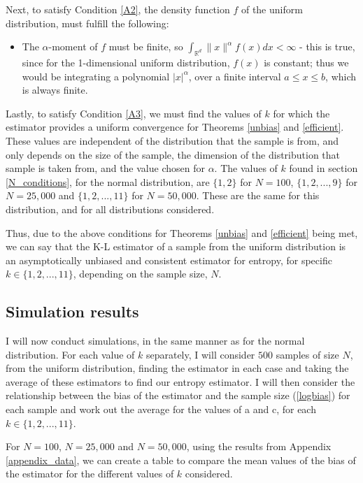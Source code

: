 \documentclass[12pt]{report}
\begin{document}
Next, to satisfy Condition \ref{A2}, the density function $f$ of the uniform distribution, must fulfill the following:
\begin{itemize}
\item The $\alpha$-moment of $f$ must be finite, so $\int_{\mathbb{R}^{d}} \| x \|^{\alpha} f(x) dx < \infty$ - this is true, since for the 1-dimensional uniform distribution, $f(x)$ is constant; thus we would be integrating a polynomial $|x|^{\alpha}$, over a finite interval $a \leq x \leq b$, which is always finite.
\end{itemize}

Lastly, to satisfy Condition \ref{A3}, we must find the values of $k$ for which the estimator provides a uniform convergence for Theorems \ref{unbias} and \ref{efficient}. These values are independent of the distribution that the sample is from, and only depends on the size of the sample, the dimension of the distribution that sample is taken from, and the value chosen for $\alpha$. The values of $k$ found in section \ref{N_conditions}, for the normal distribution, are $\{1,2\}$ for $N=100$, $\{1, 2, ..., 9\}$ for $N=25,000$ and $\{1, 2, ..., 11\}$ for $N=50,000$. These are the same for this distribution, and for all distributions considered.

Thus, due to the above conditions for Theorems \ref{unbias} and \ref{efficient} being met, we can say that the K-L estimator of a sample from the uniform distribution is an asymptotically unbiased and consistent estimator for entropy, for specific $k \in \{1, 2, ..., 11 \}$, depending on the sample size, $N$.




\subsection{Simulation results} \label{Uniform_results}

I will now conduct simulations, in the same manner as for the normal distribution. For each value of $k$ separately, I will consider $500$ samples of size $N$, from the uniform distribution, finding the estimator in each case and taking the average of these estimators to find our entropy estimator. I will then consider the relationship between the bias of the estimator and the sample size (\ref{logbias}) for each sample and work out the average for the values of a and c, for each $k \in \{1, 2, ..., 11\}$. 

For $N=100$, $N=25,000$ and $N=50,000$, using the results from Appendix \ref{appendix_data}, we can create a table to compare the mean values of the bias of the estimator for the different values of $k$ considered. 
\end{document}
